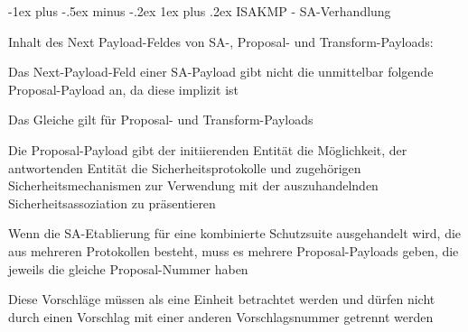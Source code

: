 \documentclass[a4paper]{article}
\makeatletter
\renewcommand{\subsubsection}{\@startsection{subsubsection}{3}{0mm}%
 {-1ex plus -.5ex minus -.2ex}%
 {1ex plus .2ex}%
 {\normalfont\small\bfseries}}
\makeatother
\begin{document}
\begin{multicols}{3}
      \subsubsection{ISAKMP - SA-Verhandlung}
      \begin{itemize*}
            \item Inhalt des Next Payload-Feldes von SA-, Proposal- und Transform-Payloads:
            \begin{itemize*}
                  \item Das Next-Payload-Feld einer SA-Payload gibt nicht die unmittelbar folgende Proposal-Payload an, da diese implizit ist
                  \item Das Gleiche gilt für Proposal- und Transform-Payloads
            \end{itemize*}
            \item Die Proposal-Payload gibt der initiierenden Entität die Möglichkeit, der antwortenden Entität die Sicherheitsprotokolle und zugehörigen Sicherheitsmechanismen zur Verwendung mit der auszuhandelnden Sicherheitsassoziation zu präsentieren
            \item Wenn die SA-Etablierung für eine kombinierte Schutzsuite ausgehandelt wird, die aus mehreren Protokollen besteht, muss es mehrere Proposal-Payloads geben, die jeweils die gleiche Proposal-Nummer haben
            \item Diese Vorschläge müssen als eine Einheit betrachtet werden und dürfen nicht durch einen Vorschlag mit einer anderen Vorschlagsnummer getrennt werden

\end{itemize*}
\end{multicols}
\end{document}
